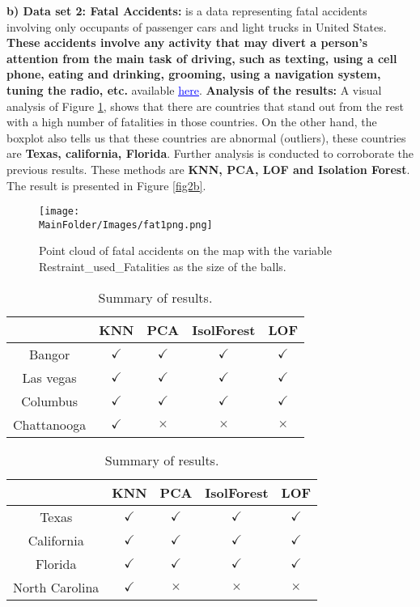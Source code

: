 \noindent \textbf{b) Data set 2: Fatal Accidents:}
 is a data representing fatal accidents involving only occupants of passenger cars and light trucks in  United States. \textbf{These accidents involve any activity that may divert a person's attention from the main task of driving, such as texting, using a cell phone, eating and drinking, grooming, using a navigation system, tuning the radio, etc.} available  \href{https://www.bts.dot.gov/content/passenger-car-and-light-truck-occupants-killed-and-restraint-use}{\textcolor{blue}{\underline{here}}}. \newl
\noindent \textbf{Analysis of the results:}
A visual analysis of Figure \ref{fig2}, shows that there are countries that stand out from the rest with a high number of fatalities in those countries. On the other hand, the boxplot  also tells us that these countries are abnormal (outliers), these countries are \textbf{Texas, california, Florida}. Further analysis is conducted to corroborate the previous results. These methods are \textbf{ KNN, PCA, LOF and Isolation Forest}. The result is presented in Figure \ref{fig2b}. 
\begin{figure}
    \centering
    \texttt{[image: \\MainFolder/Images/fat1png.png]}
    \caption{Point cloud of fatal accidents on the map with the variable Restraint\_used\_Fatalities as the size of the balls.}%
    \label{fig2}
\end{figure}
%
%
\begin{table}
\centering
 \begin{tabular}{||c c c c c||} 
 \hline
 &  KNN & PCA & IsolForest & LOF\\ [0.5ex] 
 \hline\hline
Bangor & $\checkmark$ & $\checkmark$  & $\checkmark$ & $\checkmark$ \\ 
 Las vegas & $\checkmark$ & $\checkmark$  & $\checkmark$ & $\checkmark$ \\
Columbus & $\checkmark$ & $\checkmark$  & $\checkmark$ & $\checkmark$ \\
 Chattanooga & $\checkmark$ & $\times$  & $\times$ & $\times$ \\ [1ex] 
 \hline
 \end{tabular}
 \caption{Summary of results.}
 \label{fig2w}
\end{table}
\begin{table}
\centering
 \begin{tabular}{||c c c c c||} 
 \hline
 &  KNN & PCA & IsolForest & LOF\\ [0.5ex] 
 \hline\hline
Texas & $\checkmark$ & $\checkmark$  & $\checkmark$ & $\checkmark$ \\ 
 California & $\checkmark$ & $\checkmark$  & $\checkmark$ & $\checkmark$ \\
Florida & $\checkmark$ & $\checkmark$  & $\checkmark$ & $\checkmark$ \\
 North Carolina & $\checkmark$ & $\times$  & $\times$ & $\times$ \\ [1ex] 
 \hline
 \end{tabular}
 \caption{Summary of results.}
\end{table}

